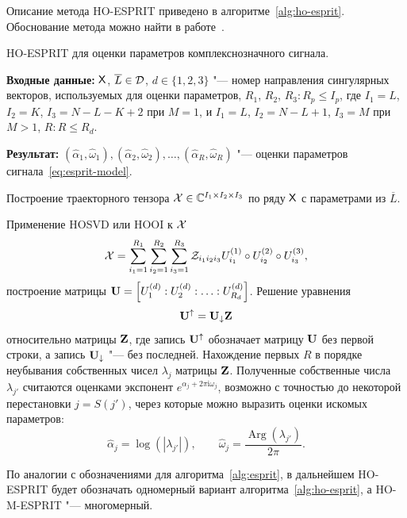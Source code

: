 \documentclass[specialist,
  substylefile=spbu_report.rtx,
subf,href,colorlinks=true, 12pt]{disser}
\theoremstyle{plain}
\theoremstyle{definition}
\theoremstyle{remark}
\newcommand{\Input}{\textbf{Входные данные: }}
\newcommand{\Output}{\textbf{Результат: }}
\newcommand{\iu}{\mathrm{i}}
\begin{document}
Описание метода HO-ESPRIT приведено в алгоритме~\ref{alg:ho-esprit}.
Обоснование метода можно найти в работе~\cite{hosvd-hooi-separation}.
\begin{algorithm}[!ht]
  \caption{HO-ESPRIT для оценки параметров комплекснозначного сигнала.}
  \label{alg:ho-esprit}
  \Input $\mathsf{X}$, $\overline{L} \in \mathcal{D}$,
  $d\in \{1, 2, 3\}$ "--- номер направления сингулярных векторов,
  используемых для оценки параметров,
  $R_1$, $R_2$, $R_3: R_p \leqslant I_p$, где
  $I_1=L$, $I_2=K$, $I_3=N-L-K+2$ при $M=1$, и
  $I_1=L$, $I_2=N-L+1$, $I_3=M$ при $M >1$,
  $R: R\leqslant R_d$.

  \Output $\left(\widehat{\alpha}_1, \widehat{\omega}_1\right),
  \left(\widehat{\alpha}_2, \widehat{\omega}_2\right), \ldots,
  \left(\widehat{\alpha}_R, \widehat{\omega}_R\right)$ "--- оценки параметров
  сигнала~\eqref{eq:esprit-model}.
  \begin{algorithmic}[1]
    \State Построение траекторного тензора $\mathcal{X}\in \mathbb{C}^{I_1\times
    I_2 \times I_3}$
    по ряду $\mathsf{X}$ с параметрами из $\overline{L}$.

    \State Применение HOSVD или HOOI к $\mathcal{X}$
    \[
      \mathcal{X} = \sum_{i_1=1}^{R_1} \sum_{i_2=1}^{R_2} \sum_{i_3=1}^{R_3}
      \mathcal{Z}_{i_1 i_2 i_3} U_{i_1}^{(1)}\circ U_{i_2}^{(2)} \circ
      U_{i_3}^{(3)},
    \]
    построение матрицы $\mathbf{U} = \left[U_1^{(d)}:U_2^{(d)}:\ldots:
    U_{R_d}^{(d)}\right]$.
    \State Решение уравнения
    \[
      \mathbf{U}^{\uparrow}=\mathbf{U}_{\downarrow}\mathbf{Z}
    \]
    относительно матрицы $\mathbf{Z}$, где запись $\mathbf{U}^{\uparrow}$
    обозначает матрицу $\mathbf{U}$ без первой строки,
    а запись $\mathbf{U}_{\downarrow}$ "--- без последней.
    \State Нахождение первых $R$ в порядке неубывания собственных
    чисел $\lambda_j$ матрицы $\mathbf{Z}$.
    Полученные собственные числа $\lambda_{j'}$ считаются оценками
    экспонент $e^{\alpha_j + 2\pi\iu \omega_j}$, возможно с точностью
    до некоторой перестановки
    $j = S (j')$, через которые можно выразить
    оценки искомых параметров:
    \[
      \widehat{\alpha}_j = \log\left(\left|\lambda_{j'}\right|\right), \qquad
      \widehat{\omega}_j =
      \frac{\operatorname{Arg}\left(\lambda_{j'}\right)}{2 \pi}.
    \]
  \end{algorithmic}
\end{algorithm}

По аналогии с обозначениями для алгоритма~\ref{alg:esprit},
в дальнейшем HO-ESPRIT будет обозначать одномерный вариант
алгоритма~\ref{alg:ho-esprit}, а HO-M-ESPRIT "--- многомерный.
\end{document}
